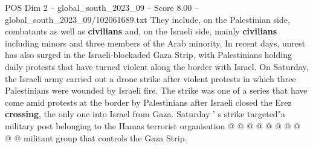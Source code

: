 \begin{textsample}{POS Dim 2 – global\_south\_2023\_09 – Score 8.00 – global\_south\_2023\_09/102061689.txt}
They include, on the Palestinian side, combatants as well as \textbf{civilians} and, on the Israeli side, mainly \textbf{civilians} including minors and three members of the Arab minority.
In recent days, unrest has also surged in the Israeli-blockaded Gaza Strip, with Palestinians holding daily protests that have turned violent along the border with Israel.
On Saturday, the Israeli army carried out a drone strike after violent protests in which three Palestinians were wounded by Israeli fire.
The strike was one of a series that have come amid protests at the border by Palestinians after Israeli closed the Erez \textbf{crossing}, the only one into Israel from Gaza.
Saturday ' s strike targeted"a military post belonging to the Hamas terrorist organisation @ @ @ @ @ @ @ @ @ @ militant group that controls the Gaza Strip.

\end{textsample}
